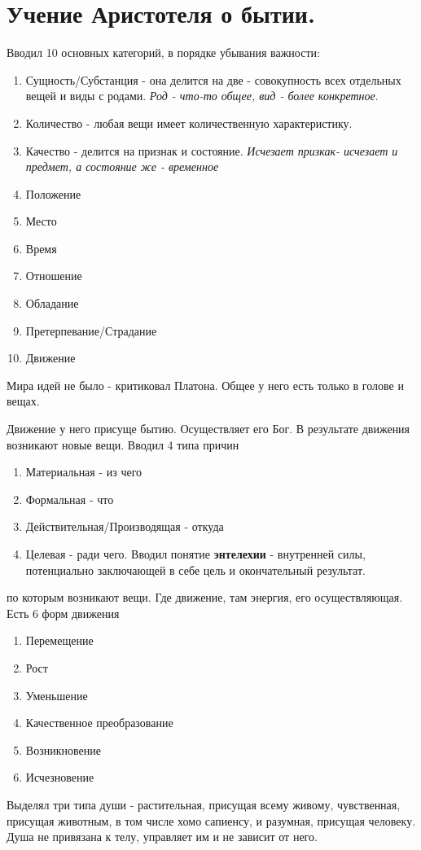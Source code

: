 \section{Учение Аристотеля о бытии.}
Вводил 10 основных категорий, в порядке убывания важности:
\begin{enumerate}
\item Сущность/Субстанция - она делится на две - совокупность всех отдельных вещей и виды с родами. \textit{Род - что-то общее, вид - более конкретное}.
\item Количество - любая вещи имеет количественную характеристику.
\item Качество - делится на признак и состояние. \textit{Исчезает призкак- исчезает и предмет, а состояние же - временное}
\item Положение
\item Место
\item Время
\item Отношение
\item Обладание
\item Претерпевание/Страдание
\item Движение
\end{enumerate}
Мира идей не было - критиковал Платона. Общее у него есть только в голове и вещах. 

Движение у него присуще бытию. Осуществляет его Бог.
В результате движения возникают новые вещи. Вводил 4 типа причин
\begin{enumerate}
\item Материальная - из чего
\item Формальная - что
\item Действительная/Производящая - откуда 
\item Целевая - ради чего. Вводил понятие \textbf{энтелехии} - внутренней силы, потенциально заключающей в себе цель и окончательный результат.
\end{enumerate}
по которым возникают вещи. Где движение, там энергия, его осуществляющая. Есть 6 форм движения
\begin{enumerate}
\item Перемещение
\item Рост
\item Уменьшение
\item Качественное преобразование
\item Возникновение
\item Исчезновение
\end{enumerate}
Выделял три типа души - растительная, присущая всему живому, чувственная, присущая животным, в том числе хомо сапиенсу, и разумная, присущая человеку. Душа не привязана к телу, управляет им и не зависит от него.

